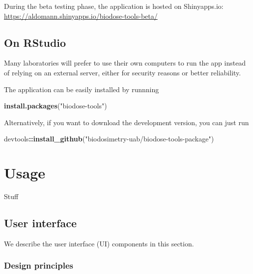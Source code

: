 \documentclass[]{scrartcl}
\newenvironment{Shaded}{\begin{snugshade}}{\end{snugshade}}
\newcommand{\KeywordTok}[1]{\textcolor[rgb]{0.13,0.29,0.53}{\textbf{#1}}}
\newcommand{\NormalTok}[1]{#1}
\newcommand{\OperatorTok}[1]{\textcolor[rgb]{0.81,0.36,0.00}{\textbf{#1}}}
\newcommand{\StringTok}[1]{\textcolor[rgb]{0.31,0.60,0.02}{#1}}
\begin{document}
During the beta testing phase, the application is hosted on Shinyapps.io: \url{https://aldomann.shinyapps.io/biodose-tools-beta/}

\hypertarget{get-offline}{%
\subsection{On RStudio}\label{get-offline}}

Many laboratories will prefer to use their own computers to run the app instead of relying on an external server, either for security reasons or better reliability.

The application can be easily installed by runnning

\begin{Shaded}
\begin{Highlighting}[]
\KeywordTok{install.packages}\NormalTok{(}\StringTok{"biodose-tools"}\NormalTok{)}
\end{Highlighting}
\end{Shaded}

Alternatively, if you want to download the development version, you can just run

\begin{Shaded}
\begin{Highlighting}[]
\NormalTok{devtools}\OperatorTok{::}\KeywordTok{install_github}\NormalTok{(}\StringTok{"biodosimetry-uab/biodose-tools-package"}\NormalTok{)}
\end{Highlighting}
\end{Shaded}

\hypertarget{manual}{%
\section{Usage}\label{manual}}

Stuff

\hypertarget{manual-ui}{%
\subsection{User interface}\label{manual-ui}}

We describe the user interface (UI) components in this section.

\hypertarget{design-principles}{%
\subsubsection{Design principles}\label{design-principles}}
\end{document}
